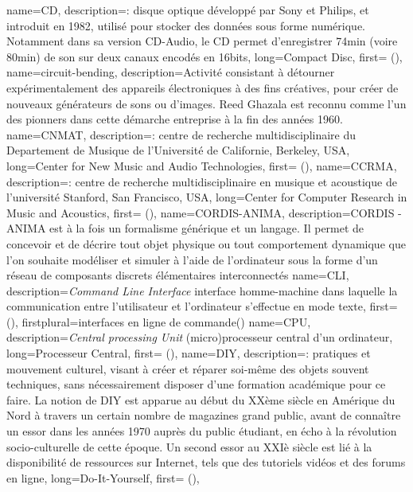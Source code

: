 {
    name={CD},
    description={\textit{}: disque optique développé par Sony et Philips, et introduit en 1982, utilisé pour stocker des données sous forme numérique. Notamment dans sa version CD-Audio, le CD permet d'enregistrer 74min (voire 80min) de son sur deux canaux encodés en 16bits},
    long={Compact Disc},
    first={} (),
}
{
    name={circuit-bending},
    description={Activité consistant à détourner expérimentalement des appareils électroniques à des fins créatives, pour créer de nouveaux générateurs de sons ou d'images. Reed Ghazala est reconnu comme l'un des pionners dans cette démarche entreprise à la fin des années 1960.}
}
{
    name={CNMAT},
    description={\textit{}: centre de recherche multidisciplinaire du Departement de Musique de l'Université de Californie, Berkeley, USA},
    long={Center for New Music and Audio Technologies},
    first={} (),
}
{
    name={CCRMA},
    description={\textit{}: centre de recherche multidisciplinaire en musique et acoustique de l'université Stanford, San Francisco, USA},
    long={Center for Computer Research in Music and Acoustics},
    first={} (),
}
{
    name={CORDIS-ANIMA},
    description={CORDIS - ANIMA est à la fois un formalisme générique et un langage. Il permet de concevoir et de décrire tout objet physique ou tout comportement dynamique que l'on souhaite modéliser et simuler à l'aide de l'ordinateur sous la forme d'un réseau de composants discrets élémentaires interconnectés}
}
{
    name={CLI},
    description={\textit{Command Line Interface} interface homme-machine dans laquelle la communication entre l'utilisateur et l'ordinateur s'effectue en mode texte},
    first={} (),
    firstplural={interfaces en ligne de commande(\glspluralsuffix)}
}
{
    name={CPU},
    description={\textit{Central processing Unit} (micro)processeur central d'un ordinateur},
    long={Processeur Central},
    first={} (),
}
{
    name={DIY},
    description={\textit{}: pratiques et mouvement culturel, visant à créer et réparer soi-même des objets souvent techniques, sans nécessairement disposer d'une formation académique pour ce faire. La notion de DIY est apparue au début du XXème siècle en Amérique du Nord à travers un certain nombre de magazines grand public, avant de connaître un essor dans les années 1970 auprès du public étudiant, en écho à la révolution socio-culturelle de cette époque. Un second essor au XXIè siècle est lié à la disponibilité de ressources sur Internet, tels que des tutoriels vidéos et des forums en ligne},
    long={Do-It-Yourself},
    first={} (),
}

